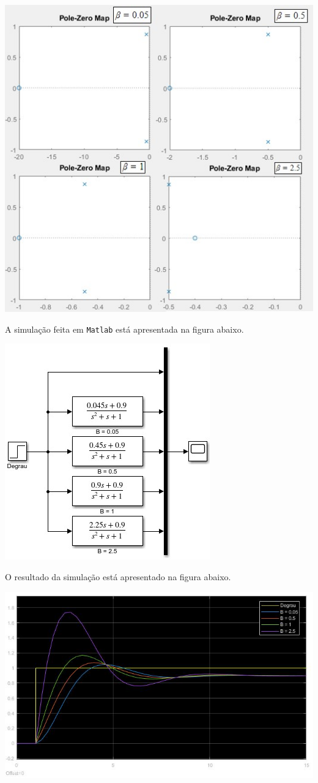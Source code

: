 \documentclass[
]{book}
\theoremstyle{definition}
\theoremstyle{definition}
\theoremstyle{definition}
\theoremstyle{remark}
\begin{document}
\includegraphics{Imagens/Lab2/prob5Varios.jpg}

A simulação feita em \texttt{Matlab} está apresentada na figura abaixo.

\includegraphics{Imagens/Lab2/modelSim5.jpg}

O resultado da simulação está apresentado na figura abaixo.

\includegraphics{Imagens/Lab2/prob5SimResult.jpg}
\end{document}
